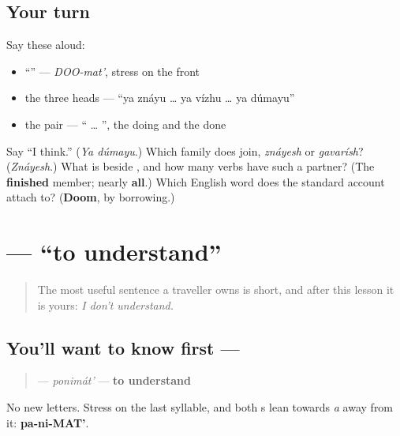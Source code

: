 \subsection*{Your turn}
Say these aloud:

\begin{itemize}
\raggedright
  \item \textquotedblleft{}\textquotedblright{} — \emph{DOO-mat'}, stress on the front
  \item the three heads — \textquotedblleft{}ya znáyu … ya vízhu … ya dúmayu\textquotedblright{}
  \item the pair — \textquotedblleft{} … \textquotedblright{}, the doing and the done
\end{itemize}

\begin{tcolorbox}[breakable,colback=teal!4,colframe=teal!35!black,title={Before you move on}]
Say \textquotedblleft{}I think.\textquotedblright{} (\emph{Ya dúmayu}.) Which family does \emph{} join, \emph{znáyesh} or \emph{gavarísh}? (\emph{Znáyesh}.) What is \emph{} beside \emph{}, and how many verbs have such a partner? (The \textbf{finished} member; nearly \textbf{all}.) Which English word does the standard account attach \emph{} to? (\textbf{Doom}, by borrowing.)
\end{tcolorbox}
\section[\texorpdfstring{\ru{понимать} (ponimát')}{понимать (ponimát')}]{ — \textquotedblleft{}to understand\textquotedblright{}}

\label{lesson:RU-C04-ponimat}



\begin{quote}
The most useful sentence a traveller owns is short, and after this lesson it is yours: \emph{I don't understand.}
\end{quote}

\subsection*{You'll want to know first — }
\begin{quote}
\textbf{} — \emph{ponimát'} — \textbf{to understand}
\end{quote}

No new letters. Stress on the last syllable, and both \textbf{}s lean towards \emph{a} away from it: \textbf{pa-ni-MAT'}.

